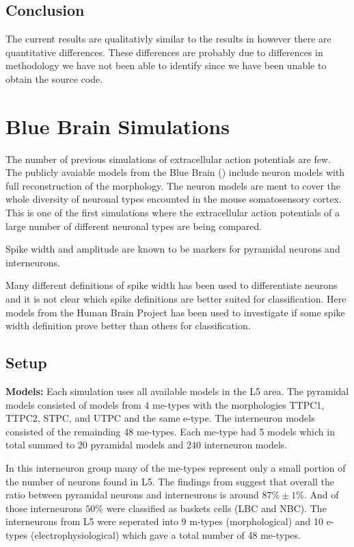 \documentclass[altfont, fleqn]{uiophd}
\renewcommand{\cref}[1]{{\color{viridis_03}\mycref{#1}}}
\begin{document}
\subsection{Conclusion}
The current results are qualitativly similar 
to the results in 
\textcite{pettersen_amplitude_2008}
however there are quantitative differences. 
These differences are probably due to 
differences in methodology we have not been able to
identify since we have been unable to obtain the source code. 

\newpage
\section{Blue Brain Simulations}
The number of previous simulations of extracellular action potentials are
few. 
The publicly avaiable models from the Blue Brain
(\cref{sec:blue_brain})
include neuron models with full reconstruction of the morphology. 
The neuron models are ment to cover the whole diversity of neuronal
types encounted in the mouse somatosensory cortex. 
This is one of the first simulations where 
the extracellular action potentials
of a large number of different neuronal types are being compared. 

Spike width and amplitude are known to be markers 
for pyramidal neurons and interneurons. 

Many different definitions of spike width has been used to differentiate neurons
and it is not clear which spike definitions are better suited for classification.
Here models from the Human Brain Project
has been used to investigate
if some spike width definition prove better than others for classification.
\newline
\subsection{Setup}
\noindent
\textbf{Models:}
Each simulation uses all available models in the L5
area. 
The pyramidal models consisted of models
from 4 me-types with the morphologies
TTPC1, TTPC2, STPC, and UTPC and the same e-type. 
The interneuron models consisted of the remainding 48 me-types.
Each me-type had 5 models which in total summed to 20
pyramidal models and 240 interneuron models. 

In this interneuron group many of the 
me-types represent only
a small portion of the number of neurons found in L5. 
The findings from 
\textcite{markram_reconstruction_2015} 
suggest
that overall the ratio between pyramidal neurons
and interneurons is around $87\% \pm 1\%$. 
And of those interneurons $50\%$ were classified as 
baskets cells (LBC and NBC).
The interneurons from L5 were seperated into 
9 m-types (morphological) and 10 e-types (electrophysiological)
which gave a total number
of 48 me-types.
\end{document}
